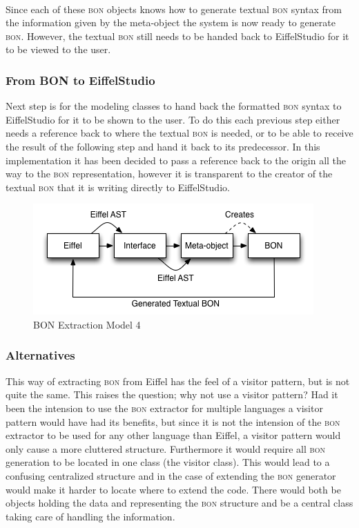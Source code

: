 \paragraph{}
Since each of these \textsc{bon} objects knows how to generate textual \textsc{bon} syntax from the information given by the meta-object the system is now ready to generate \textsc{bon}. However, the textual \textsc{bon} still needs to be handed back to EiffelStudio for it to be viewed to the user.

\subsubsection{From BON to EiffelStudio}
Next step is for the modeling classes to hand back the formatted \textsc{bon} syntax to EiffelStudio for it to be shown to the user. To do this each previous step either needs a reference back to where the textual \textsc{bon} is needed, or to be able to receive the result of the following step and hand it back to its predecessor. In this implementation it has been decided to pass a reference back to the origin all the way to the \textsc{bon} representation, however it is transparent to the creator of the textual \textsc{bon} that it is writing directly to EiffelStudio.

\begin{figure}[H]
\centering
\includegraphics[scale=0.8]{images/BON-extraction-model-4.png}
\caption{BON Extraction Model 4}
\label{fig:bon_extraction_4}
\end{figure}

\subsubsection{Alternatives}
This way of extracting \textsc{bon} from Eiffel has the feel of a visitor pattern, but is not quite the same. This raises the question; why not use a visitor pattern? Had it been the intension to use the \textsc{bon} extractor for multiple languages a visitor pattern would have had its benefits, but since it is not the intension of the \textsc{bon} extractor to be used for any other language than Eiffel, a visitor pattern would only cause a more cluttered structure. Furthermore it would require all \textsc{bon} generation to be located in one class (the visitor class). This would lead to a confusing centralized structure and in the case of extending the \textsc{bon} generator would make it harder to locate where to extend the code. There would both be objects holding the data and representing the \textsc{bon} structure and be a central class taking care of handling the information.
